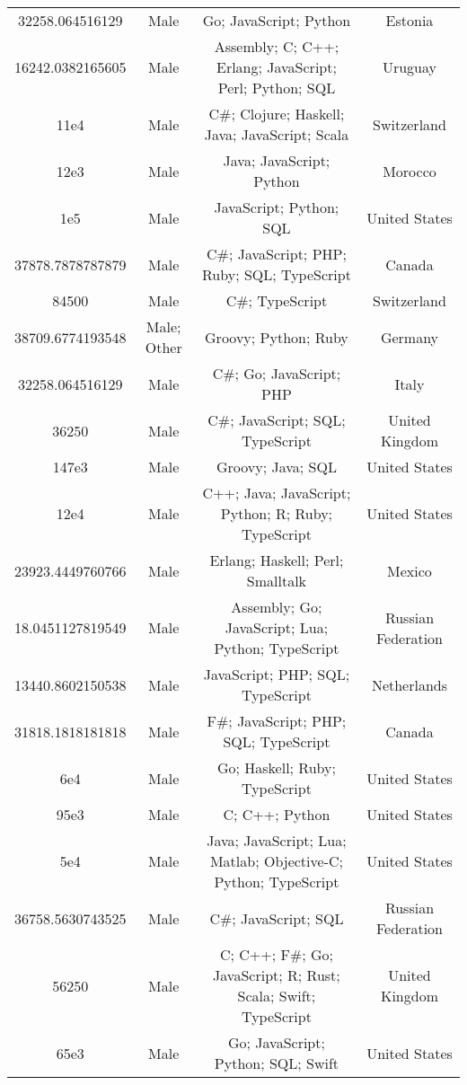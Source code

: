 \begin{center}
\begin{tabular}{ |c|c|c|c| }
32258.064516129  &  Male  &  Go; JavaScript; Python  &  Estonia  \\ 
16242.0382165605  &  Male  &  Assembly; C; C++; Erlang; JavaScript; Perl; Python; SQL  &  Uruguay  \\ 
11e4  &  Male  &  C\#; Clojure; Haskell; Java; JavaScript; Scala  &  Switzerland  \\ 
12e3  &  Male  &  Java; JavaScript; Python  &  Morocco  \\ 
1e5  &  Male  &  JavaScript; Python; SQL  &  United States  \\ 
37878.7878787879  &  Male  &  C\#; JavaScript; PHP; Ruby; SQL; TypeScript  &  Canada  \\ 
84500  &  Male  &  C\#; TypeScript  &  Switzerland  \\ 
38709.6774193548  &  Male; Other  &  Groovy; Python; Ruby  &  Germany  \\ 
32258.064516129  &  Male  &  C\#; Go; JavaScript; PHP  &  Italy  \\ 
36250  &  Male  &  C\#; JavaScript; SQL; TypeScript  &  United Kingdom  \\ 
147e3  &  Male  &  Groovy; Java; SQL  &  United States  \\ 
12e4  &  Male  &  C++; Java; JavaScript; Python; R; Ruby; TypeScript  &  United States  \\ 
23923.4449760766  &  Male  &  Erlang; Haskell; Perl; Smalltalk  &  Mexico  \\ 
18.0451127819549  &  Male  &  Assembly; Go; JavaScript; Lua; Python; TypeScript  &  Russian Federation  \\ 
13440.8602150538  &  Male  &  JavaScript; PHP; SQL; TypeScript  &  Netherlands  \\ 
31818.1818181818  &  Male  &  F\#; JavaScript; PHP; SQL; TypeScript  &  Canada  \\ 
6e4  &  Male  &  Go; Haskell; Ruby; TypeScript  &  United States  \\ 
95e3  &  Male  &  C; C++; Python  &  United States  \\ 
5e4  &  Male  &  Java; JavaScript; Lua; Matlab; Objective-C; Python; TypeScript  &  United States  \\ 
36758.5630743525  &  Male  &  C\#; JavaScript; SQL  &  Russian Federation  \\ 
56250  &  Male  &  C; C++; F\#; Go; JavaScript; R; Rust; Scala; Swift; TypeScript  &  United Kingdom  \\ 
65e3  &  Male  &  Go; JavaScript; Python; SQL; Swift  &  United States  \\ 

\end{tabular}
\end{center}
